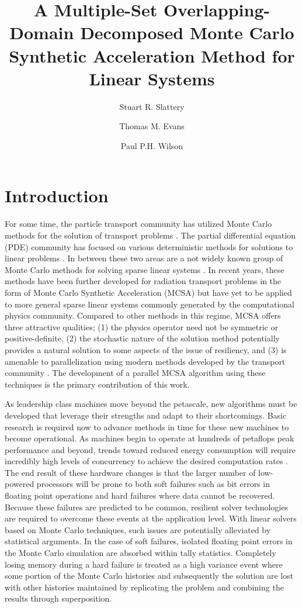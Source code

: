 \documentclass{snamc2013}
\title{A Multiple-Set Overlapping-Domain Decomposed Monte Carlo
  Synthetic Acceleration Method for Linear Systems}
\author[1]{Stuart R. Slattery}
\author[2]{Thomas M. Evans}
\author[1]{Paul P.H. Wilson}
\affil[1]{University of Wisconsin - Madison, Engineering Physics
  Department, 1500 Engineering Dr., Madison, WI 53706}
\affil[2]{Oak Ridge National Laboratory, Reactor and Nuclear Systems
  Division, 1 Bethel Valley Rd., Oak Ridge, TN 37831}
\begin{document}
\section{Introduction}

For some time, the particle transport community has utilized Monte
Carlo methods for the solution of transport problems
\cite{lewis_computational_1993}. The partial differential equation
(PDE) community has focused on various deterministic methods for
solutions to linear problems \cite{saad_iterative_2003,
  kelley_iterative_1995}. In between these two areas are a not widely
known group of Monte Carlo methods for solving sparse linear systems
\cite{forsythe_matrix_1950, hammersley_monte_1964,
  halton_sequential_1962, halton_sequential_1994}. In recent years,
these methods have been further developed for radiation transport
problems in the form of Monte Carlo Synthetic Acceleration (MCSA)
\cite{evans_monte_2009, evans_monte_2012} but have yet to be applied
to more general sparse linear systems commonly generated by the
computational physics community. Compared to other methods in this
regime, MCSA offers three attractive qualities; (1) the physics
operator need not be symmetric or positive-definite, (2) the
stochastic nature of the solution method potentially provides a
natural solution to some aspects of the issue of resiliency, and (3)
is amenable to parallelization using modern methods developed by the
transport community \cite{wagner_hybrid_2010}. The development of a
parallel MCSA algorithm using these techniques is the primary
contribution of this work.

As leadership class machines move beyond the petascale, new algorithms
must be developed that leverage their strengths and adapt to their
shortcomings. Basic research is required now to advance methods in
time for these new machines to become operational. As machines begin
to operate at hundreds of petaflops peak performance and beyond,
trends toward reduced energy consumption will require incredibly high
levels of concurrency to achieve the desired computation rates
\cite{kogge_using_2011}. The end result of these hardware changes is
that the larger number of low-powered processors will be prone to both
soft failures such as bit errors in floating point operations and hard
failures where data cannot be recovered. Because these failures are
predicted to be common, resilient solver technologies are required to
overcome these events at the application level. With linear solvers
based on Monte Carlo techniques, such issues are potentially
alleviated by statistical arguments. In the case of soft failures,
isolated floating point errors in the Monte Carlo simulation are
absorbed within tally statistics. Completely losing memory during a
hard failure is treated as a high variance event where some portion of
the Monte Carlo histories and subsequently the solution are lost with
other histories maintained by replicating the problem and combining
the results through superposition.
\end{document}
